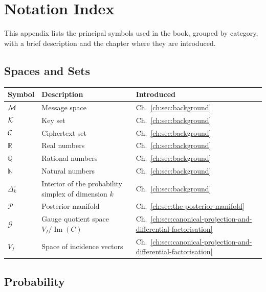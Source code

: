 \chapter[Notation]{Notation Index}\label{ch:sec:notation}

This appendix lists the principal symbols used in the book,
grouped by category, with a brief description and the chapter
where they are introduced.

\section*{Spaces and Sets}

\begin{center}
\begin{tabular}{lll}
\hline
\textbf{Symbol} & \textbf{Description} & \textbf{Introduced} \\
\hline
  $\mathcal{M}$ & Message space & Ch.~\ref{ch:sec:background} \\
  $\mathcal{K}$ & Key set & Ch.~\ref{ch:sec:background} \\
  $\mathcal{C}$ & Ciphertext set & Ch.~\ref{ch:sec:background} \\
  $\mathbb R$ & Real numbers & Ch.~\ref{ch:sec:background} \\
  $\mathbb Q$ & Rational numbers & Ch.~\ref{ch:sec:background} \\
  $\mathbb N$ & Natural numbers & Ch.~\ref{ch:sec:background} \\
  $\Delta_k^\circ$ & Interior of the probability simplex of dimension $k$ & Ch.~\ref{ch:sec:background} \\
  $\mathcal P$ & Posterior manifold & Ch.~\ref{ch:sec:the-posterior-manifold} \\
  $\mathcal G$ & Gauge quotient space $V_I/\operatorname{Im}(C)$ & Ch.~\ref{ch:sec:canonical-projection-and-differential-factorisation} \\
  $V_I$ & Space of incidence vectors & Ch.~\ref{ch:sec:canonical-projection-and-differential-factorisation} \\
\hline
\end{tabular}
\end{center}

\section*{Probability}

